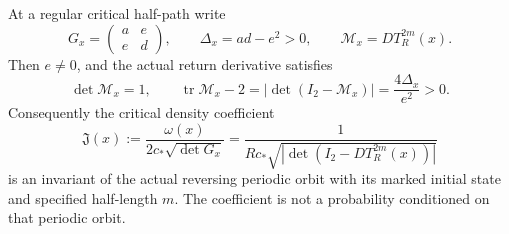 \begin{theorem}
\label{thm:cr-monodromy}
At a regular critical half-path write
\[
 G_x=\begin{pmatrix}a&e\\e&d\end{pmatrix},\qquad
 \Delta_x=ad-e^2>0,\qquad
 \mathcal M_x=D T_R^{2m}(x).
\]
Then $e\ne0$, and the actual return derivative satisfies
\begin{equation}\label{eq:cr-monodromy}
 \det\mathcal M_x=1,\qquad
 \operatorname{tr}\mathcal M_x-2
   =|\det(I_2-\mathcal M_x)|
   =\frac{4\Delta_x}{e^2}>0.
\end{equation}
Consequently the critical density coefficient
\begin{equation}\label{eq:cr-jump}
 \mathfrak J(x):=\frac{\omega(x)}{2c_*\sqrt{\det G_x}}
   =\frac{1}{Rc_*\sqrt{|\det(I_2-D T_R^{2m}(x))|}}
\end{equation}
is an invariant of the actual reversing periodic orbit with its
marked initial state and specified half-length $m$. The coefficient
is not a probability conditioned on that periodic orbit.
\end{theorem}
